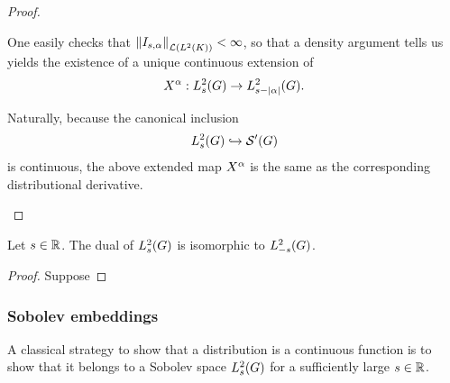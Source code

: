 \begin{proof}
\begin{itemize}
            One easily checks that $\norm [\Lin{\Lebesgue 2 \CompactGroup}] {I_{s, \alpha}} < \infty$,
            so that a density argument tells us yields the existence of a unique continuous extension of
            \begin{align*}
                \LeftDifferentialOperator \alpha : \Sobolev s \to \Sobolev {s - \abs \alpha}.
            \end{align*}

            Naturally, because the canonical inclusion
            \begin{align*}
                \Sobolev s \hookrightarrow \TemperedDistributions \Group
            \end{align*}
            is continuous,
            the above extended map $\LeftDifferentialOperator \alpha$ is the same as the corresponding distributional derivative.
    \end{itemize}
\end{proof}

\begin{proposition}[Duality]
    Let $s \in \R$.
    The dual of $\Sobolev s$ is isomorphic to $\Sobolev {-s}$.
\end{proposition}
\begin{proof}
    Suppose
\end{proof}

\subsubsection{Sobolev embeddings}

A classical strategy to show that a distribution is a continuous function
is to show that it belongs to a Sobolev space $\Sobolev s$ for a sufficiently large $s \in \R$.

